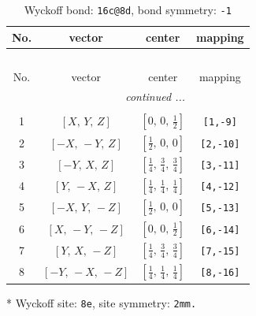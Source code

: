 \documentclass[fleqn,8pt]{jsarticle}
\begin{document}
\renewcommand{\arraystretch}{1.2}
\begin{longtable}{cccc}
\caption{Wyckoff bond: {\tt 16c@8d}, bond symmetry: {\tt -1}}
 \\
 \hline \hline
No. & vector & center & mapping \\ \hline \endfirsthead

\multicolumn{3}{l}{\tablename\ \thetable{}} \\
 \hline \hline
No. & vector & center & mapping \\ \hline \endhead

 \hline \hline
\multicolumn{3}{r}{\footnotesize\it continued ...} \\ \endfoot

 \hline \hline
\multicolumn{3}{r}{} \\ \endlastfoot

1 & $\left[ X,\, Y,\, Z \right]$ & $\left[ 0,\, 0,\, \frac{1}{2} \right]$ & {\tt [1,-9]} \\ \hline
2 & $\left[ - X,\, - Y,\, Z \right]$ & $\left[ \frac{1}{2},\, 0,\, 0 \right]$ & {\tt [2,-10]} \\ \hline
3 & $\left[ - Y,\, X,\, Z \right]$ & $\left[ \frac{1}{4},\, \frac{3}{4},\, \frac{3}{4} \right]$ & {\tt [3,-11]} \\ \hline
4 & $\left[ Y,\, - X,\, Z \right]$ & $\left[ \frac{1}{4},\, \frac{1}{4},\, \frac{1}{4} \right]$ & {\tt [4,-12]} \\ \hline
5 & $\left[ - X,\, Y,\, - Z \right]$ & $\left[ \frac{1}{2},\, 0,\, 0 \right]$ & {\tt [5,-13]} \\ \hline
6 & $\left[ X,\, - Y,\, - Z \right]$ & $\left[ 0,\, 0,\, \frac{1}{2} \right]$ & {\tt [6,-14]} \\ \hline
7 & $\left[ Y,\, X,\, - Z \right]$ & $\left[ \frac{1}{4},\, \frac{3}{4},\, \frac{3}{4} \right]$ & {\tt [7,-15]} \\ \hline
8 & $\left[ - Y,\, - X,\, - Z \right]$ & $\left[ \frac{1}{4},\, \frac{1}{4},\, \frac{1}{4} \right]$ & {\tt [8,-16]} \\
\end{longtable}
* Wyckoff site: {\tt 8e}, site symmetry: {\tt 2mm.}
\renewcommand{\arraystretch}{1.2}
\end{document}
